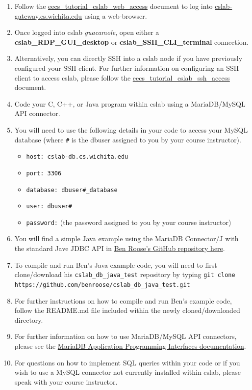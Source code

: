 \documentclass[12pt]{article}
\begin{document}
\begin{flushleft}
\begin{enumerate}
  \item Follow the \href{https://github.com/benroose/tutorials/blob/master/cslab_tutorials/eecs_tutorial_cslab_web_access.pdf}{eecs\_tutorial\_cslab\_web\_access} document to log into \href{https://cslab-gateway.cs.wichita.edu/}{cslab-gateway.cs.wichita.edu} using a web-browser.
  \item Once logged into cslab \textit{guacamole}, open either a \textbf{cslab\_RDP\_GUI\_desktop} or \textbf{cslab\_SSH\_CLI\_terminal} connection.
  \item Alternatively, you can directly SSH into a cslab node if you have previously configured your SSH client. For further information on configuring an SSH client to access cslab, please follow the \href{https://github.com/benroose/tutorials/blob/master/cslab_tutorials/eecs_tutorial_cslab_ssh_access.pdf}{eecs\_tutorial\_cslab\_ssh\_access} document.
  \item Code your C, C++, or Java program within cslab using a MariaDB/MySQL API connector. \break
  \item You will need to use the following details in your code to access your MySQL database (where \texttt{\#} is the dbuser assigned to you by your course instructor).
    \begin{itemize}
      \item \verb|host: cslab-db.cs.wichita.edu|
      \item \verb|port: 3306|
      \item \verb|database: dbuser#_database|
      \item \verb|user: dbuser#|
      \item \verb|password:| (the password assigned to you by your course instructor)
    \end{itemize}
  \item You will find a simple Java example using the MariaDB Connector/J with the standard Jave JDBC API in \href{https://github.com/benroose/cslab_db_java_test}{Ben Roose's GitHub repository here}.
  \item To compile and run Ben's Java example code, you will need to first clone/download his \verb|cslab_db_java_test| repository by typing \break
    \verb|git clone https://github.com/benroose/cslab_db_java_test.git|
  \item For further instructions on how to compile and run Ben's example code, follow the README.md file included within the newly cloned/downloaded directory.
  \item For further information on how to use MariaDB/MySQL API connectors, please see the \href{https://mariadb.com/kb/en/library/connectors/}{MariaDB Application Programming Interfaces documentation}.
  \item For questions on how to implement SQL queries within your code or if you wish to use a MySQL connector not currently installed within cslab, please speak with your course instructor.
\end{enumerate}


\end{flushleft}
\end{document}
